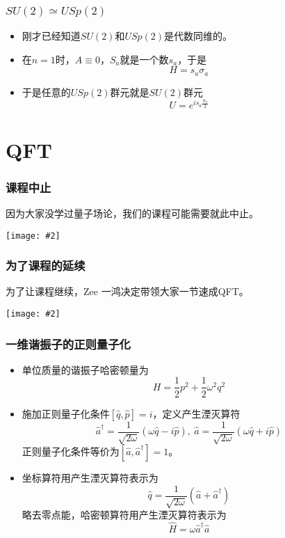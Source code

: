 \documentclass[CJK]{beamer}
\def\secpage#1#2{\begin{frame}\bch\bcenter{\bf \Huge #1} \skipline \tbox{#2}\ecenter\ech\end{frame}}
\newcommand{\cpic}[2]{
\begin{center}
\texttt{[image: \#2]}
\end{center}
}
\begin{document}
\begin{frame}
\frametitle{\bch $SU(2) \simeq USp(2)$ \ech}
\bch
\begin{itemize}
\item
刚才已经知道$SU(2)$和$USp(2)$是代数同维的。
\item
在$n=1$时，$A \equiv 0$，$S_a$就是一个数$s_a$，于是
$$
H = s_a \sigma_a
$$
\item
于是任意的$USp(2)$群元就是$SU(2)$群元
$$
U = e^{i s_a \frac{\sigma_a}{2}}
$$
\end{itemize}
\ech
\end{frame}

\section{QFT}
\secpage{量子场论速成}{$$\hat \phi \sim \hat a + \hat a^\dagger$$}

\begin{frame}
\frametitle{\bch 课程中止 \ech}
\bch
因为大家没学过量子场论，我们的课程可能需要就此中止。
\cpic{0.2}{sad}
\ech
\end{frame}

\begin{frame}
\frametitle{\bch 为了课程的延续 \ech}
\bch
为了让课程继续，Zee 一鸿决定带领大家一节速成QFT。
\cpic{0.2}{happy}
\ech
\end{frame}

\begin{frame}
\frametitle{\bch 一维谐振子的正则量子化 \ech}
\bch
\begin{itemize}
\item
单位质量的谐振子哈密顿量为
$$
H = \frac{1}{2} p^2 + \frac{1}{2} \omega^2 q^2
$$
\item
施加正则量子化条件$[\hat q, \hat p] = i$，定义产生湮灭算符
$$
\hat{a}^\dagger = \frac{1}{\sqrt{2\omega}} ( \omega \hat q - i \hat p),\ \hat{a} = \frac{1}{\sqrt{2\omega}} ( \omega \hat q + i \hat p)
$$
正则量子化条件等价为$[\hat a,\hat{a}^\dagger] = 1$。
\item
坐标算符用产生湮灭算符表示为
$$
\hat q = \frac{1}{\sqrt{2\omega}} ( \hat a + \hat{a}^\dagger)
$$
略去零点能，哈密顿算符用产生湮灭算符表示为
$$
\hat H = \omega \hat{a}^\dagger \hat{a}
$$
\end{itemize}
\ech
\end{frame}
\end{document}
